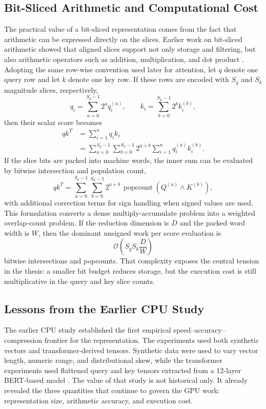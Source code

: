 \subsection{Bit-Sliced Arithmetic and Computational Cost}
The practical value of a bit-sliced representation comes from the fact that arithmetic can be expressed directly on the slices. Earlier work on bit-sliced arithmetic showed that aligned slices support not only storage and filtering, but also arithmetic operators such as addition, multiplication, and dot product \cite{rinfret2001bsi}. Adopting the same row-wise convention used later for attention, let $q$ denote one query row and let $k$ denote one key row. If these rows are encoded with $S_q$ and $S_k$ magnitude slices, respectively,
\begin{equation}
    q_i = \sum_{a=0}^{S_q-1} 2^a q_i^{(a)},
    \qquad
    k_i = \sum_{b=0}^{S_k-1} 2^b k_i^{(b)},
\end{equation}
then their scalar score becomes
\begin{align}
    q k^T
    &= \sum_{i=1}^{n} q_i k_i \\
    &= \sum_{a=0}^{S_q-1} \sum_{b=0}^{S_k-1} 2^{a+b} \sum_{i=1}^{n} q_i^{(a)} k_i^{(b)}.
\end{align}
If the slice bits are packed into machine words, the inner sum can be evaluated by bitwise intersection and population count,
\begin{equation}
    q k^T = \sum_{a=0}^{S_q-1} \sum_{b=0}^{S_k-1} 2^{a+b} \, \operatorname{popcount}\!\left(Q^{(a)} \wedge K^{(b)}\right),
\end{equation}
with additional correction terms for sign handling when signed values are used. This formulation converts a dense multiply-accumulate problem into a weighted overlap-count problem. If the reduction dimension is $D$ and the packed word width is $W$, then the dominant unsigned work per score evaluation is
\begin{equation}
    \mathcal{O}\!\left(S_q S_k \frac{D}{W}\right)
\end{equation}
bitwise intersections and popcounts. That complexity exposes the central tension in the thesis: a smaller bit budget reduces storage, but the execution cost is still multiplicative in the query and key slice counts.

\subsection{Lessons from the Earlier CPU Study}
The earlier CPU study established the first empirical speed--accuracy--compression frontier for the representation. The experiments used both synthetic vectors and transformer-derived tensors. Synthetic data were used to vary vector length, numeric range, and distributional skew, while the transformer experiments used flattened query and key tensors extracted from a 12-layer BERT-based model \cite{bert,imdb}. The value of that study is not historical only. It already revealed the three quantities that continue to govern the GPU work: representation size, arithmetic accuracy, and execution cost.

